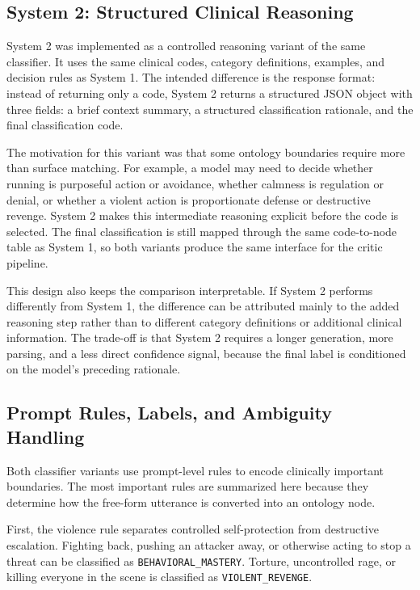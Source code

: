 \subsection{System 2: Structured Clinical Reasoning}

System 2 was implemented as a controlled reasoning variant of the same classifier. It uses the same clinical codes, category definitions, examples, and decision rules as System 1. The intended difference is the response format: instead of returning only a code, System 2 returns a structured JSON object with three fields: a brief context summary, a structured classification rationale, and the final classification code.

The motivation for this variant was that some ontology boundaries require more than surface matching. For example, a model may need to decide whether running is purposeful action or avoidance, whether calmness is regulation or denial, or whether a violent action is proportionate defense or destructive revenge. System 2 makes this intermediate reasoning explicit before the code is selected. The final classification is still mapped through the same code-to-node table as System 1, so both variants produce the same interface for the critic pipeline.

This design also keeps the comparison interpretable. If System 2 performs differently from System 1, the difference can be attributed mainly to the added reasoning step rather than to different category definitions or additional clinical information. The trade-off is that System 2 requires a longer generation, more parsing, and a less direct confidence signal, because the final label is conditioned on the model's preceding rationale.

\subsection{Prompt Rules, Labels, and Ambiguity Handling}

Both classifier variants use prompt-level rules to encode clinically important boundaries. The most important rules are summarized here because they determine how the free-form utterance is converted into an ontology node.

First, the violence rule separates controlled self-protection from destructive escalation. Fighting back, pushing an attacker away, or otherwise acting to stop a threat can be classified as \texttt{BEHAVIORAL\_MASTERY}. Torture, uncontrolled rage, or killing everyone in the scene is classified as \texttt{VIOLENT\_REVENGE}.

